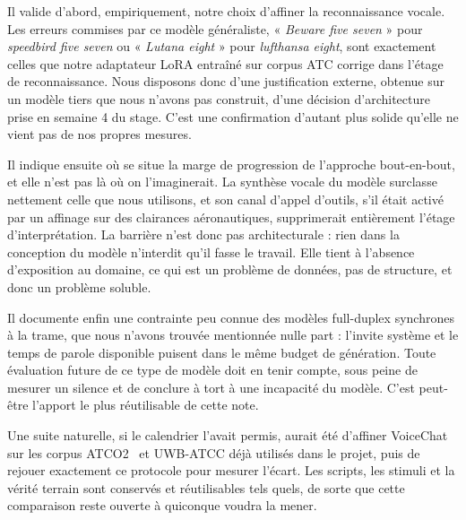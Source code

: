 \documentclass[11pt,a4paper]{article}
\begin{document}
Il valide d'abord, empiriquement, notre choix d'affiner la reconnaissance
vocale. Les erreurs commises par ce modèle généraliste, « \emph{Beware five
seven} » pour \emph{speedbird five seven} ou « \emph{Lutana eight} » pour
\emph{lufthansa eight}, sont exactement celles que notre adaptateur LoRA entraîné
sur corpus ATC corrige dans l'étage de reconnaissance. Nous disposons donc d'une
justification externe, obtenue sur un modèle tiers que nous n'avons pas
construit, d'une décision d'architecture prise en semaine 4 du stage. C'est
une confirmation d'autant plus solide qu'elle ne vient pas de nos propres
mesures.

Il indique ensuite où se situe la marge de progression de l'approche
bout-en-bout, et elle n'est pas là où on l'imaginerait. La synthèse vocale du
modèle surclasse nettement celle que nous utilisons, et son canal d'appel
d'outils, s'il était activé par un affinage sur des clairances aéronautiques,
supprimerait entièrement l'étage d'interprétation. La barrière n'est donc pas
architecturale : rien dans la conception du modèle n'interdit qu'il fasse le
travail. Elle tient à l'absence d'exposition au domaine, ce qui est un problème
de données, pas de structure, et donc un problème soluble.

Il documente enfin une contrainte peu connue des modèles full-duplex synchrones
à la trame, que nous n'avons trouvée mentionnée nulle part : l'invite système et
le temps de parole disponible puisent dans le même budget de génération. Toute
évaluation future de ce type de modèle doit en tenir compte, sous peine de
mesurer un silence et de conclure à tort à une incapacité du modèle. C'est
peut-être l'apport le plus réutilisable de cette note.

Une suite naturelle, si le calendrier l'avait permis, aurait été d'affiner
VoiceChat sur les corpus ATCO2~\cite{atco2} et UWB-ATCC déjà utilisés dans le
projet, puis de
rejouer exactement ce protocole pour mesurer l'écart. Les scripts, les stimuli et
la vérité terrain sont conservés et réutilisables tels quels, de sorte que cette
comparaison reste ouverte à quiconque voudra la mener.

\clearpage
\renewcommand{\refname}{Références}
\end{document}
